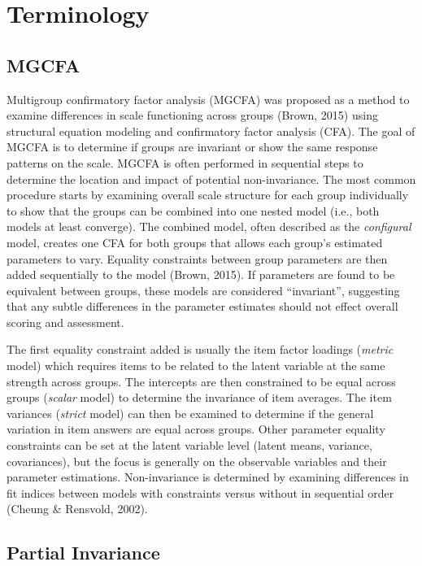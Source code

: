 \documentclass[
  man]{apa7}
\begin{document}
\section{Terminology}\label{terminology}

\subsection{MGCFA}\label{mgcfa}

Multigroup confirmatory factor analysis (MGCFA) was proposed as a method to examine differences in scale functioning across groups (Brown, 2015) using structural equation modeling and confirmatory factor analysis (CFA). The goal of MGCFA is to determine if groups are invariant or show the same response patterns on the scale. MGCFA is often performed in sequential steps to determine the location and impact of potential non-invariance. The most common procedure starts by examining overall scale structure for each group individually to show that the groups can be combined into one nested model (i.e., both models at least converge). The combined model, often described as the \emph{configural} model, creates one CFA for both groups that allows each group's estimated parameters to vary. Equality constraints between group parameters are then added sequentially to the model (Brown, 2015). If parameters are found to be equivalent between groups, these models are considered ``invariant'', suggesting that any subtle differences in the parameter estimates should not effect overall scoring and assessment.

The first equality constraint added is usually the item factor loadings (\emph{metric} model) which requires items to be related to the latent variable at the same strength across groups. The intercepts are then constrained to be equal across groups (\emph{scalar} model) to determine the invariance of item averages. The item variances (\emph{strict} model) can then be examined to determine if the general variation in item answers are equal across groups. Other parameter equality constraints can be set at the latent variable level (latent means, variance, covariances), but the focus is generally on the observable variables and their parameter estimations. Non-invariance is determined by examining differences in fit indices between models with constraints versus without in sequential order (Cheung \& Rensvold, 2002).

\subsection{Partial Invariance}\label{partial-invariance}
\end{document}
